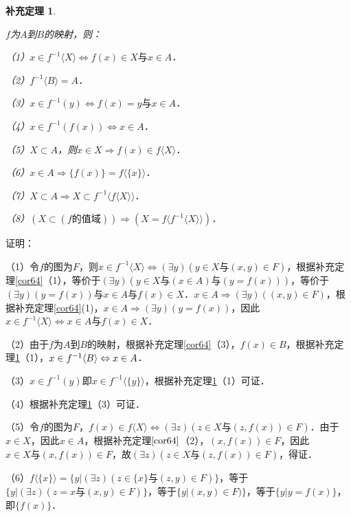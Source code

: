 \documentclass[12pt, a4paper, oneside]{book}
\newtheorem{cor}{补充定理}
\begin{document}
			\begin{cor}\label{cor70}
				\hfill\par
				$f$为$A$到$B$的映射，则：
				\par
				（1）$x\in f^{-1}\langle X \rangle \Leftrightarrow f(x)\in X\text{与}x\in A$．
				\par
				（2）$f^{-1}\langle B \rangle = A$．
				\par
				（3）$x\in f^{-1}(y)\Leftrightarrow f(x)=y\text{与}x\in A$．
				\par
				（4）$x\in f^{-1}(f(x))\Leftrightarrow x\in A$．
				\par
				（5）$X\subset A$，则$x\in X\Rightarrow f(x)\in f\langle X \rangle $．
				\par
				（6）$x\in A\Rightarrow \{f(x)\}=f\langle \{x\} \rangle $．
				\par
				（7）$X\subset A\Rightarrow X\subset f^{-1}\langle f\langle X \rangle \rangle$．
				\par
				（8）$(X\subset(f\text{的值域}))\Rightarrow (X=f\langle f^{-1}\langle X \rangle \rangle)$．
			\end{cor}
			证明：
			\par
			（1）令$f$的图为$F$，则$x\in f^{-1}\langle X \rangle \Leftrightarrow (\exists y)(y\in X\text{与}(x, y) \in F)$，根据补充定理\ref{cor64}（1），等价于$(\exists y)(y\in X\text{与}(x\in A)\text{与}(y=f(x)))$，等价于$(\exists y)(y=f(x))\text{与}x\in A\text{与}f(x) \in X$．$x\in A \Rightarrow (\exists y)((x, y)\in F)$，根据补充定理\ref{cor64}(1)，$x\in A \Rightarrow (\exists y)(y=f(x))$，因此$x\in f^{-1}\langle X \rangle \Leftrightarrow x\in A\text{与}f(x) \in X$．
			\par
			（2）由于$f$为$A$到$B$的映射，根据补充定理\ref{cor64}（3），$f(x)\in B$，根据补充定理\ref{cor70}（1），$x\in f^{-1}\langle B \rangle \\\Leftrightarrow x\in A$．
			\par
			（3）$x\in f^{-1}(y)$即$x\in f^{-1}\langle\{y\}\rangle$，根据补充定理\ref{cor70}（1）可证．
			\par
			（4）根据补充定理\ref{cor70}（3）可证．
			\par
			（5）令$f$的图为$F$，$f(x)\in f\langle X \rangle \Leftrightarrow (\exists z)(z\in X\text{与}(z, f(x))\in F)$．由于$x\in X$，因此$x\in A$，根据补充定理$\ref{cor64}$（2），$(x, f(x)) \in F$，因此$x\in X\text{与}(x, f(x)) \in F$，故$(\exists z)(z\in X\text{与}(z, f(x))\in F)$，得证．
			\par
			（6）$f\langle \{x\} \rangle =\{y|(\exists z)(z\in \{x\}\text{与}(z, y)\in F)\}$，等于$\{y|(\exists z)(z=x\text{与}(x, y)\in F)\}$，等于$\{y|(x, y)\in F)\}$，等于$\{y|y=f(x)\}$，即$\{f(x)\}$．
\end{document}
